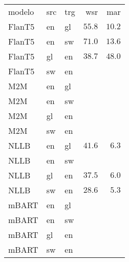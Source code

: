 \begin{tabular}{lllrr}
modelo & src & trg & wsr & mar \\
FlanT5 & en & gl & $55.8$ & $10.2$ \\
FlanT5 & en & sw & $71.0$ & $13.6$ \\
FlanT5 & gl & en & $38.7$ & $48.0$ \\
FlanT5 & sw & en &  &  \\
M2M & en & gl &  &  \\
M2M & en & sw &  &  \\
M2M & gl & en &  &  \\
M2M & sw & en &  &  \\
NLLB & en & gl & $41.6$ & $6.3$ \\
NLLB & en & sw &  &  \\
NLLB & gl & en & $37.5$ & $6.0$ \\
NLLB & sw & en & $28.6$ & $5.3$ \\
mBART & en & gl &  &  \\
mBART & en & sw &  &  \\
mBART & gl & en &  &  \\
mBART & sw & en &  &  \\
\end{tabular}
